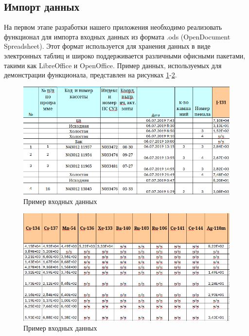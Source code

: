 \subsection{Импорт данных}

На первом этапе разработки нашего приложения необходимо реализовать функционал для импорта входных данных из формата .ods (OpenDocument Spreadsheet). Этот формат используется для хранения данных в виде электронных таблиц и широко поддерживается различными офисными пакетами, такими как LibreOffice и OpenOffice. Пример данных, используемых для демонстрации функционала, представлен на рисунках \ref{fig:ris4}-\ref{fig:ris5}.

\begin{figure}[H]
	\centering
	\includegraphics[width=1\linewidth]{pics/ris4} %
	\caption{Пример входных данных}
	\label{fig:ris4} %
\end{figure}

\begin{figure}[H]
	\centering
	\includegraphics[width=1\linewidth]{pics/ris5} %
	\caption{Пример входных данных}
	\label{fig:ris5} %
\end{figure}

